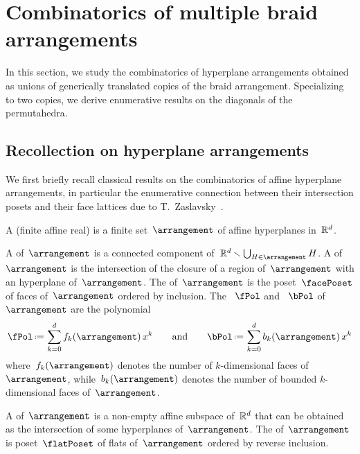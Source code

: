 
\section{Combinatorics of multiple braid arrangements}
\label{sec:combinatorics}

In this section, we study the combinatorics of hyperplane arrangements obtained as unions of generically translated copies of the braid arrangement.
Specializing to two copies, we derive enumerative results on the diagonals of the permutahedra.

\subsection{Recollection on hyperplane arrangements}
\label{subsec:arrangements}

We first briefly recall classical results on the combinatorics of affine hyperplane arrangements, in particular the enumerative connection between their intersection posets and their face lattices due to T.~Zaslavsky~\cite{Zaslavsky}.

\begin{definition}
A (finite affine real)  is a finite set~$\arrangement$ of affine hyperplanes in~$\mathbb R^d$.
\end{definition}

\begin{definition}
A  of~$\arrangement$ is a connected component of~$\R^d \ssm \bigcup_{H \in \arrangement} H$.
A  of~$\arrangement$ is the intersection of the closure of a region of~$\arrangement$ with an hyperplane of~$\arrangement$.
The  of~$\arrangement$ is the poset~$\facePoset$ of faces of~$\arrangement$ ordered by inclusion.
The ~$\fPol$ and ~$\bPol$ of~$\arrangement$ are the polynomial
\[
\fPol \eqdef \sum_{k = 0}^d f_k(\arrangement) \, x^k
\qquad\text{and}\qquad
\bPol \eqdef \sum_{k = 0}^d b_k(\arrangement) \, x^k
\]
where~$f_k(\arrangement)$ denotes the number of $k$-dimensional faces of~$\arrangement$, while~$b_k(\arrangement)$ denotes the number of bounded $k$-dimensional faces of~$\arrangement$.
\end{definition}

\begin{definition}
A  of~$\arrangement$ is a non-empty affine subspace of~$\mathbb R^d$ that can be obtained as the intersection of some hyperplanes of~$\arrangement$.
The  of~$\arrangement$ is poset~$\flatPoset$ of flats of~$\arrangement$ ordered by reverse inclusion.
\end{definition}


